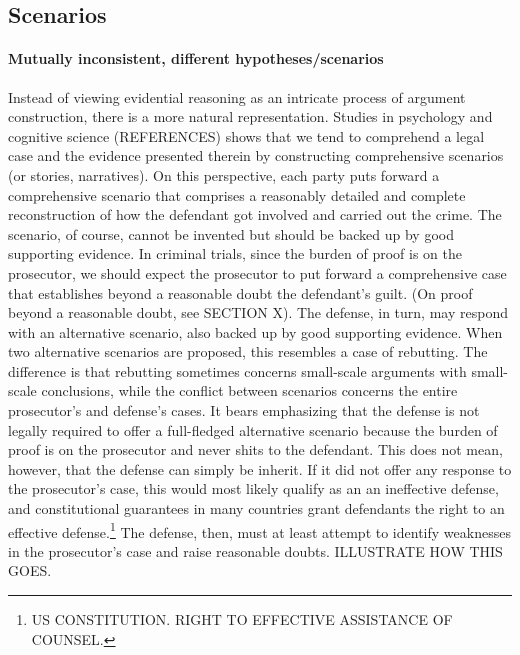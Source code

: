 \documentclass[10pt]{article}
\begin{document}
\subsection{Scenarios}

\paragraph{Mutually inconsistent, different hypotheses/scenarios}

Instead of viewing evidential reasoning as an intricate process of argument construction, 
there is a more natural representation. Studies in psychology and cognitive 
science (REFERENCES) shows that we tend to comprehend a legal case and the evidence presented therein 
by constructing comprehensive scenarios (or stories, narratives). On this perspective, each party puts forward 
a comprehensive scenario that comprises a reasonably detailed and complete 
reconstruction of how the defendant got involved and carried out the crime. The scenario, of course, 
cannot be invented but should be backed up by good supporting evidence. In criminal trials, since the burden of proof is on the prosecutor, 
we should expect the prosecutor to put forward a comprehensive case that establishes beyond a reasonable doubt the defendant's guilt. (On proof beyond a reasonable doubt, see SECTION X). The defense, in turn, may respond with an alternative scenario, also backed up by good supporting evidence. 
When two alternative scenarios are proposed, this resembles a case of rebutting. The difference is that rebutting sometimes concerns 
small-scale arguments with small-scale conclusions, while the conflict between scenarios 
concerns the entire prosecutor's and defense's cases. 
It bears emphasizing that the defense is not legally required to offer a full-fledged alternative scenario because 
the burden of proof is on the prosecutor and never shits to the defendant. This does not mean, however, 
that the defense can simply be inherit. If it did not offer any response to the prosecutor's case, this would most 
likely qualify as an an ineffective defense, and constitutional guarantees in many countries grant defendants 
the right to an effective defense.\footnote{US CONSTITUTION. RIGHT TO EFFECTIVE ASSISTANCE OF COUNSEL.} %
The defense, then, must at least attempt to identify weaknesses in the prosecutor's case 
and raise reasonable doubts. ILLUSTRATE HOW THIS GOES. 
\end{document}
